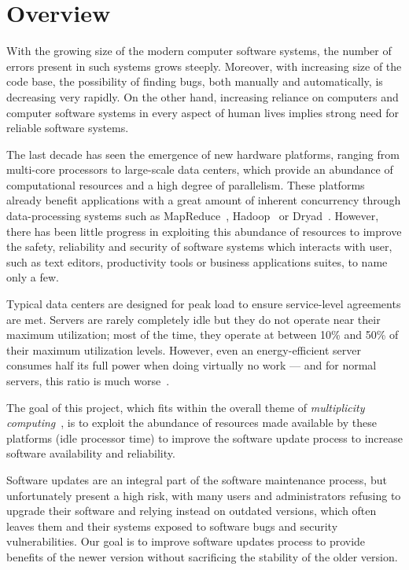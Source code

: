 \chapter{Overview}
\label{chap:overview}

With the growing size of the modern computer software systems, the number of
errors present in such systems grows steeply.  Moreover, with increasing size
of the code base, the possibility of finding bugs, both manually and
automatically, is decreasing very rapidly. On the other hand, increasing
reliance on computers and computer software systems in every aspect of human
lives implies strong need for reliable software systems.

The last decade has seen the emergence of new hardware platforms, ranging from
multi-core processors to large-scale data centers, which provide an abundance
of computational resources and a high degree of parallelism. These platforms
already benefit applications with a great amount of inherent concurrency
through data-processing systems such as MapReduce~\cite{map-reduce},
Hadoop~\cite{hadoop} or Dryad~\cite{dryad}. However, there has been little
progress in exploiting this abundance of resources to improve the safety,
reliability and security of software systems which interacts with user, such as
text editors, productivity tools or business applications suites, to name only
a few.

Typical data centers are designed for peak load to ensure service-level
agreements are met. Servers are rarely completely idle but they do not operate
near their maximum utilization; most of the time, they operate at between 10\%
and 50\% of their maximum utilization levels. However, even an energy-efficient
server consumes half its full power when doing virtually no work --- and for
normal servers, this ratio is much worse~\cite{barroso2007}.


The goal of this project, which fits within the overall theme of {\it
multiplicity computing}~\cite{multiplicity}, is to exploit the abundance of
resources made available by these platforms (\eg idle processor time) to
improve the software update process to increase software availability and
reliability.

Software updates are an integral part of the software maintenance process, but
unfortunately present a high risk, with many users and administrators refusing
to upgrade their software and relying instead on outdated versions, which often
leaves them and their systems exposed to software bugs and security
vulnerabilities. Our goal is to improve software updates process to provide
benefits of the newer version without sacrificing the stability of the older
version.

